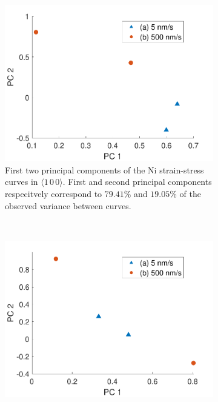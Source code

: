 \begin{figure}[t]
    \centering
    \begin{subfigure}[t]{0.45\linewidth}
        \centering
        \includegraphics[width=\linewidth]{../data/Ni100_pca.pdf}
        \caption[First two principal components of the Ni strain-stress curves in $\langle 1\,0\,0 \rangle$.]{First two principal components of the Ni strain-stress curves in $\langle 1\,0\,0 \rangle$. First and second principal components respecitvely correspond to $79.41\%$ and $19.05\%$ of the observed variance between curves.}
        \label{sf:Ni100_pca}
    \end{subfigure}
    ~
    \begin{subfigure}[t]{0.45\linewidth}
        \centering
        \includegraphics[width=\linewidth]{../data/Ni110_pca.pdf}

\end{subfigure}
\end{figure}
